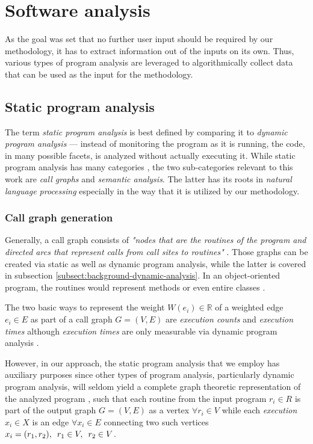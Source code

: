 \documentclass[12pt,a4paper]{report}
\begin{document}
\section{Software analysis} \label{sect:background-program-analysis}

As the goal was set that no further user input should be required
by our methodology, it has to extract information out of the inputs on its own.
Thus, various types of program analysis are leveraged to algorithmically
collect data that can be used as the input for the methodology.


\subsection{Static program analysis}

The term \textit{static program analysis} is best defined by comparing it to
\textit{dynamic program analysis} --- instead of monitoring the program as it
is running, the code, in many possible facets, is analyzed without actually
executing it. While static program analysis has many categories
\cite{woegerer2005static}, the two sub-categories relevant to this work are
\textit{call graphs} and \textit{semantic analysis}. The latter has its
roots in \textit{natural language processing} especially in the way that it is
utilized by our methodology.


\subsubsection{Call graph generation} \label{subsubsect:call-graph-static}
Generally, a call graph consists of \textit{"nodes that are the routines
of the program and directed arcs that represent calls from call sites to
routines"} \cite{graham1982gprof}. Those graphs can be created via static as
well as dynamic program analysis, while the latter is covered in subsection
\ref{subsect:background-dynamic-analysis}. In an object-oriented program, the
routines would represent methods or even entire classes
\cite{grove1997callgraph}.

The two basic ways to represent the weight \(W(e_i) \in \mathbb{R}\) of a
weighted edge \(e_i \in E\) as part of a call graph \(G = (V, E)\) are
\textit{execution counts} and \textit{execution times} although
\textit{execution times} are only measurable via dynamic program analysis
\cite{graham1982gprof}.

However, in our approach, the static program analysis that we employ has
auxiliary purposes since other types of program analysis, particularly dynamic
program analysis, will seldom yield a complete graph theoretic representation
of the analyzed program \cite{graham1982gprof}, such that each routine from the
input program \(r_i \in R\) is part of the output graph \(G = (V, E)\) as a
vertex \(\forall r_i \in V\) while each \textit{execution} \(x_i \in X\) is an
edge \(\forall x_i \in E\) connecting two such vertices \(x_i = (r_1, r_2),
\enskip r_1 \in V, \enskip r_2 \in V\).
\end{document}
